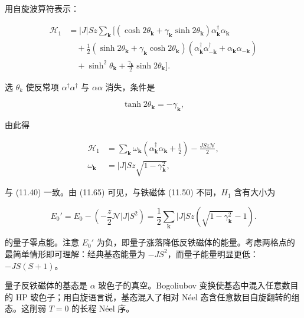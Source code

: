 用自旋波算符表示：

\begin{align*}
\mathcal {H} _ {1} & = | J | S z \sum_ {\mathbf {k}} \Big[ \left( \cosh 2 \theta_ {\mathbf {k}} + \gamma_ {\mathbf {k}} \sinh 2 \theta_ {\mathbf {k}} \right) \alpha_ {\mathbf {k}} ^ {\dagger} \alpha_ {\mathbf {k}}\\
& \quad + \frac {1}{2} \left( \sinh 2 \theta_ {\mathbf {k}} + \gamma_ {\mathbf {k}} \cosh 2 \theta_ {\mathbf {k}} \right) \left( \alpha_ {\mathbf {k}} ^ {\dagger} \alpha_ {- \mathbf {k}} ^ {\dagger} + \alpha_ {\mathbf {k}} \alpha_ {- \mathbf {k}} \right)\\
& \quad + \sinh^ {2} \theta_ {\mathbf {k}} + \frac {\gamma_ {\mathbf {k}}}{2} \sinh 2 \theta_ {\mathbf {k}} \Big] .
\tag{11.63}
\end{align*}

选 $\theta_{k}$ 使反常项 $\alpha^{\dagger}\alpha^{\dagger}$ 与 $\alpha\alpha$ 消失，条件是

\begin{equation*}
\tanh 2 \theta_ {\mathbf {k}} = - \gamma_ {\mathbf {k}} ,
\tag{11.64}
\end{equation*}

由此得

\begin{align*}
\mathcal {H} _ {1} & = \sum_ {\mathbf {k}} \omega_ {\mathbf {k}} \left( \alpha_ {\mathbf {k}} ^ {\dagger} \alpha_ {\mathbf {k}} + \frac {1}{2} \right) - \frac {J S z \mathcal {N}}{2} ,\\
\omega_ {\mathbf {k}} & = | J | S z \sqrt {1 - \gamma_ {\mathbf {k}} ^ {2}} ,
\tag{11.65}
\end{align*}

与 (11.40) 一致。由 (11.65) 可见，与铁磁体 (11.50) 不同，$H_{1}$ 含有大小为

\begin{equation*}
E _ {0} ' = E _ {0} - \left( - \frac {z}{2} \mathcal {N} | J | S ^ {2} \right) = \frac {1}{2} \sum_{\mathbf {k}} | J | S z \left( \sqrt {1 - \gamma_{\mathbf {k}} ^ {2}} - 1 \right).
\tag{11.66}
\end{equation*}

的量子零点能。注意 $E_{0}'$ 为负，即量子涨落降低反铁磁体的能量。考虑两格点的最简单情形即可理解：经典基态能量为 $-JS^{2}$，而量子能量明显更低：$-JS(S+1)$。

量子反铁磁体的基态是 $\alpha$ 玻色子的真空。Bogoliubov 变换使基态中混入任意数目的 HP 玻色子；用自旋语言说，基态混入了相对 Néel 态含任意数目自旋翻转的组态。这削弱 $T = 0$ 的长程 Néel 序。

